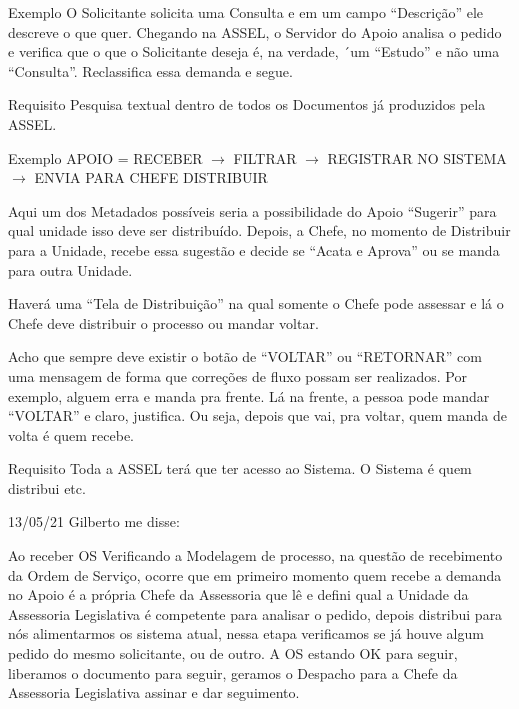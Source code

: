 \begin{exemplo}{Exemplo}
	O Solicitante solicita uma Consulta e em um campo “Descrição” ele descreve o que quer. Chegando na ASSEL, o Servidor do Apoio analisa o pedido e verifica que o que o Solicitante deseja é, na verdade, ´um “Estudo” e não uma “Consulta”. Reclassifica essa demanda e segue.
\end{exemplo}

\begin{requisito}{Requisito}
	Pesquisa textual dentro de todos os Documentos já produzidos pela ASSEL.
\end{requisito}

\begin{exemplo}{Exemplo}
	APOIO = RECEBER $\rightarrow$ FILTRAR $\rightarrow$ REGISTRAR NO SISTEMA $\rightarrow$ ENVIA PARA CHEFE DISTRIBUIR
\end{exemplo}

Aqui um dos Metadados possíveis seria a possibilidade do Apoio “Sugerir” para qual unidade isso deve ser distribuído. Depois, a Chefe, no momento de Distribuir para a Unidade, recebe essa sugestão e decide se “Acata e Aprova” ou se manda para outra Unidade.

Haverá uma “Tela de Distribuição” na qual somente o Chefe pode assessar e lá o Chefe deve distribuir o processo ou mandar voltar.

Acho que sempre deve existir o botão de “VOLTAR” ou “RETORNAR” com uma mensagem de forma que correções de fluxo possam ser realizados. Por exemplo, alguem erra e manda pra frente. Lá na frente, a pessoa pode mandar “VOLTAR” e claro, justifica. Ou seja, depois que vai, pra voltar, quem manda de volta é quem recebe.

\begin{requisito}{Requisito}
	Toda a ASSEL terá que ter acesso ao Sistema. O Sistema é quem distribui  etc.
\end{requisito}


13/05/21 Gilberto me disse:

\begin{importante}[1]{Ao receber OS}
	Verificando a Modelagem de processo, na questão de recebimento da Ordem de Serviço, ocorre que em primeiro momento quem recebe a demanda no Apoio é a própria Chefe da Assessoria que lê e defini qual a Unidade da Assessoria Legislativa é competente para analisar o pedido, depois distribui para nós alimentarmos os sistema atual, nessa etapa verificamos se já houve algum pedido do mesmo solicitante, ou de outro. A OS estando OK para seguir, liberamos o documento para seguir, geramos o Despacho para a Chefe da Assessoria Legislativa assinar e dar seguimento.
\end{importante}

